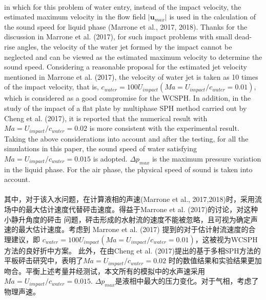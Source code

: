 \documentclass[UTF8]{ctexart}
\begin{document}
\paragraph{\quad}in which for this problem of water entry, instead of the 
                impact velocity, the estimated maximum velocity in the 
                flow field $|\mathbf{u}_{max}|$ is used in the calculation of the sound 
                speed for liquid phase (Marrone et al., 2017, 2018). 
                Thanks for the discussion in Marrone et al. (2017), 
                for such impact problems with small dead-rise angles, 
                the velocity of the water jet formed by the impact cannot 
                be neglected and can be viewed as the estimated maximum 
                velocity to determine the sound speed. Considering a 
                reasonable proposal for the estimated jet velocity mentioned 
                in Marrone et al. (2017), the velocity of water jet is taken as 
                10 times of the impact velocity, that is, $c_{water} = 100U_{impact} 
                (Ma = U_{impact}/c_{water} = 0.01)$, which is considered as a good 
                compromise for the WCSPH. In addition, in the study of the impact 
                of a flat plate by multiphase SPH method carried out by Cheng et al. 
                (2017), it is reported that the numerical result with 
                $Ma = U_{impact}/c_{water} = 0.02$ is more consistent with the experimental 
                result. Taking the above considerations into account and after the 
                testing, for all the simulations in this paper, the sound speed of water 
                satisfying $Ma = U_{impact}/c_{water} = 0.015$ is adopted. $\Delta p_{max}$ is the maximum 
                pressure variation in the liquid phase. For the air phase, the physical 
                speed of sound is taken into account.
\paragraph{\quad}其中，对于该入水问题，在计算液相的声速(Marrone et al., 2017,2018)时，采用流
                场中的最大估计速度代替砰击速度。得益于Marrone et al. (2017)的讨论，对这种小静升角度的砰击
                问题，砰击形成的水射流的速度不能被忽略，且可视为确定声速的最大估计速度。考虑到
                Marrone et al. (2017) 提到的对于估计射流速度的合理建议，即 $c_{water} = 100U_{impact} 
                (Ma = U_{impact}/c_{water} = 0.01)$，这被视为WCSPH方法的良好折中方案。
                此外，在由Cheng et al. (2017)提出的基于多相SPH方法的平板砰击研究中，表明了$Ma = U_{impact}/c_{water} = 0.02$
                时的数值结果和实验结果更加吻合。平衡上述考量并经测试，本文所有的模拟中的水声速采用 $Ma = U_{impact}/c_{water} = 0.015$.
                $\Delta p_{max}$是液相中最大的压力变化。对于气相，考虑了物理声速。 
\end{document}
